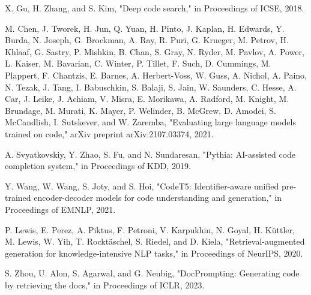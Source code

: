 \documentclass[conference]{IEEEtran}
\begin{document}
\begin{thebibliography}{1}
X. Gu, H. Zhang, and S. Kim, "Deep code search," in Proceedings of ICSE, 2018.

M. Chen, J. Tworek, H. Jun, Q. Yuan, H. Pinto, J. Kaplan, H. Edwards, Y. Burda, N. Joseph, G. Brockman, A. Ray, R. Puri, G. Krueger, M. Petrov, H. Khlaaf, G. Sastry, P. Mishkin, B. Chan, S. Gray, N. Ryder, M. Pavlov, A. Power, L. Kaiser, M. Bavarian, C. Winter, P. Tillet, F. Such, D. Cummings, M. Plappert, F. Chantzis, E. Barnes, A. Herbert-Voss, W. Guss, A. Nichol, A. Paino, N. Tezak, J. Tang, I. Babuschkin, S. Balaji, S. Jain, W. Saunders, C. Hesse, A. Car, J. Leike, J. Achiam, V. Misra, E. Morikawa, A. Radford, M. Knight, M. Brundage, M. Murati, K. Mayer, P. Welinder, B. McGrew, D. Amodei, S. McCandlish, I. Sutskever, and W. Zaremba, "Evaluating large language models trained on code," arXiv preprint arXiv:2107.03374, 2021.

A. Svyatkovskiy, Y. Zhao, S. Fu, and N. Sundaresan, "Pythia: AI-assisted code completion system," in Proceedings of KDD, 2019.

Y. Wang, W. Wang, S. Joty, and S. Hoi, "CodeT5: Identifier-aware unified pre-trained encoder-decoder models for code understanding and generation," in Proceedings of EMNLP, 2021.

P. Lewis, E. Perez, A. Piktus, F. Petroni, V. Karpukhin, N. Goyal, H. Küttler, M. Lewis, W. Yih, T. Rocktäschel, S. Riedel, and D. Kiela, "Retrieval-augmented generation for knowledge-intensive NLP tasks," in Proceedings of NeurIPS, 2020.

S. Zhou, U. Alon, S. Agarwal, and G. Neubig, "DocPrompting: Generating code by retrieving the docs," in Proceedings of ICLR, 2023.

\end{thebibliography}
\end{document}
